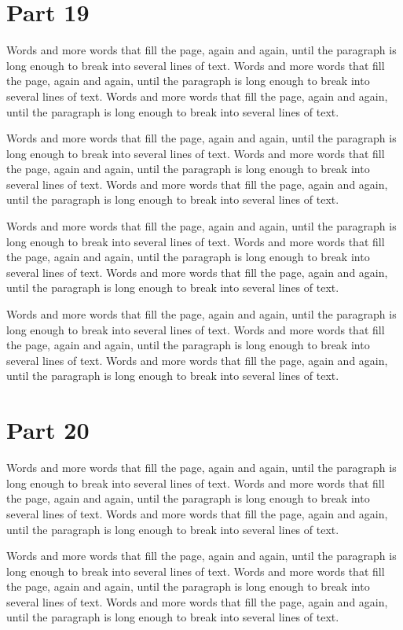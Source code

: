 \documentclass{article}
\begin{document}
\section{Part 19}
Words and more words that fill the page, again and again, until the paragraph is long enough to break into several lines of text. Words and more words that fill the page, again and again, until the paragraph is long enough to break into several lines of text. Words and more words that fill the page, again and again, until the paragraph is long enough to break into several lines of text. 

Words and more words that fill the page, again and again, until the paragraph is long enough to break into several lines of text. Words and more words that fill the page, again and again, until the paragraph is long enough to break into several lines of text. Words and more words that fill the page, again and again, until the paragraph is long enough to break into several lines of text. 

Words and more words that fill the page, again and again, until the paragraph is long enough to break into several lines of text. Words and more words that fill the page, again and again, until the paragraph is long enough to break into several lines of text. Words and more words that fill the page, again and again, until the paragraph is long enough to break into several lines of text. 

Words and more words that fill the page, again and again, until the paragraph is long enough to break into several lines of text. Words and more words that fill the page, again and again, until the paragraph is long enough to break into several lines of text. Words and more words that fill the page, again and again, until the paragraph is long enough to break into several lines of text. 

\section{Part 20}
Words and more words that fill the page, again and again, until the paragraph is long enough to break into several lines of text. Words and more words that fill the page, again and again, until the paragraph is long enough to break into several lines of text. Words and more words that fill the page, again and again, until the paragraph is long enough to break into several lines of text. 

Words and more words that fill the page, again and again, until the paragraph is long enough to break into several lines of text. Words and more words that fill the page, again and again, until the paragraph is long enough to break into several lines of text. Words and more words that fill the page, again and again, until the paragraph is long enough to break into several lines of text. 
\end{document}
